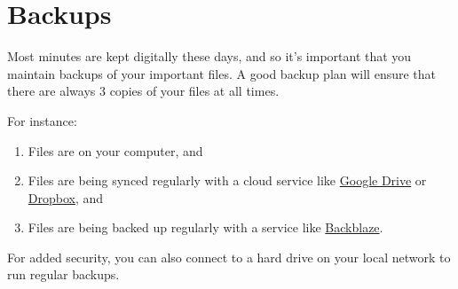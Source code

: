 \documentclass[
]{book}
\providecommand{\tightlist}{%
  \setlength{\itemsep}{0pt}\setlength{\parskip}{0pt}}
\begin{document}
\hypertarget{backups}{%
\section{Backups}\label{backups}}

Most minutes are kept digitally these days, and so it's important that you maintain backups of your important files. A good backup plan will ensure that there are always 3 copies of your files at all times.

For instance:

\begin{enumerate}
\def\labelenumi{\arabic{enumi}.}
\tightlist
\item
  Files are on your computer, and
\item
  Files are being synced regularly with a cloud service like \href{https://drive.google.com}{Google Drive} or \href{https://dropbox.com}{Dropbox}, and
\item
  Files are being backed up regularly with a service like \href{https://www.backblaze.com}{Backblaze}.
\end{enumerate}

For added security, you can also connect to a hard drive on your local network to run regular backups.
\end{document}
